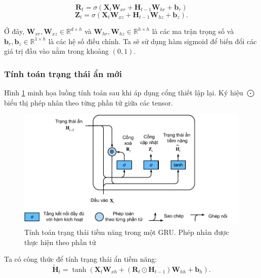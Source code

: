 \documentclass[conference]{IEEEtran}
\begin{document}
\begin{equation*}
    \mathbf{R}_t = \sigma(\mathbf{X}_t \mathbf{W}_{xr} + \mathbf{H}_{t-1} \mathbf{W}_{hr} + \mathbf{b}_r)
\end{equation*}
\begin{equation*}
    \mathbf{Z}_t = \sigma(\mathbf{X}_t \mathbf{W}_{xz} + \mathbf{H}_{t-1} \mathbf{W}_{hz} + \mathbf{b}_z).
\end{equation*}

Ở đây, $\mathbf{W}_{xr}, \mathbf{W}_{xz} \in \mathbb{R}^{d \times h}$ và $\mathbf{W}_{hr}, \mathbf{W}_{hz} \in \mathbb{R}^{h \times h}$ là các ma trận trọng số và $\mathbf{b}_r, \mathbf{b}_z \in \mathbb{R}^{1 \times h}$ là các hệ số điều chỉnh. Ta sẽ sử dụng hàm sigmoid để biến đổi các giá trị đầu vào nằm trong khoảng $(0, 1)$.

\subsubsection{Tính toán trạng thái ẩn mới}
Hình \ref{fig:gru_del} minh họa luồng tính toán sau khi áp dụng cổng thiết lập lại. Ký hiệu \(\bigodot\) biểu thị phép nhân theo từng phần tử giữa các tensor.

\begin{figure}[H]
    \centering
    \begin{minipage}{0.43\textwidth}
        \centering
        \includegraphics[width=1\textwidth]{bibliography/figure/GRU/gru_2.pdf}
        \caption{Tính toán trạng thái tiềm năng trong một GRU. Phép nhân được thực hiện theo phần tử}
        \label{fig:gru_del}
    \end{minipage}

\end{figure}

Ta có công thức để tính trạng thái ẩn tiềm năng:
\begin{equation*}
    \tilde{\mathbf{H}}_t = \tanh (\mathbf{X}_t \mathbf{W}_{xh} + (\mathbf{R}_t \odot \mathbf{H}_{t-1}) \mathbf{W}_{hh} + \mathbf{b}_h).
\end{equation*}
\end{document}
